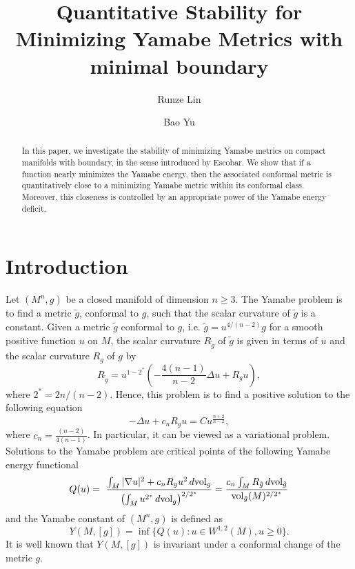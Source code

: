 \documentclass[12pt]{amsart}
\title[Quantitative Stability]{Quantitative Stability for Minimizing Yamabe Metrics with minimal boundary}
\newcommand{\na}{{\nabla}}
\newcommand{\vol}{{\rm{vol}}}
\begin{document}
\author{Runze Lin}
\address{Institut de Mathématiques de Toulouse, Université Paul Sabatier, 118, route de Narbonne, 31062 Toulouse
Cedex, France}
\author{Bao Yu }
\address{School of Mathematical Sciences, University of Science and Technology of China, Hefei, Anhui Province, P. R. China, 230006}


\begin{abstract}
	In this paper, we investigate the stability of minimizing Yamabe metrics on compact manifolds with boundary, in the sense introduced by Escobar. We show that if a function nearly minimizes the Yamabe energy, then the associated conformal metric is quantitatively close to a minimizing Yamabe metric within its conformal class. Moreover, this closeness is controlled by an appropriate power of the Yamabe energy deficit.
	\vskip0.3cm
	\\
\end{abstract}
\maketitle
\section{Introduction}
    Let $(M^n,g)$ be a closed manifold  of dimension $n\ge 3$. The Yamabe problem is to find a metric  $\tilde{g}$, conformal to $g$, such that the scalar curvature of $\tilde{g}$ is a constant. Given a metric $\tilde{g}$ conformal to $g$, i.e.  $\tilde{g} = u^{4/(n-2)} g$ for  a smooth positive function $u$ on $M$, the scalar curvature $R_{\tilde{g}}$ of $\tilde{g}$ is given in terms of $u$ and the scalar curvature $R_g$ of $g$  by
\begin{equation}\label{eqn: comformal change}
R_{\tilde{g}} = u^{1-2^*}\left(-\frac{4(n-1)}{n-2} \Delta u + R_g u \right),
\end{equation}
where $2^* = 2n/(n-2)$. Hence, this problem is to find  a positive solution to the following equation
\begin{equation}\label{eqn: yamabe equation}
    -\Delta u + c_nR_g u = C u^\frac{n+2}{n-2},
\end{equation}
where $c_n =\frac{(n-2)}{4(n-1)}$. In particular, it can be viewed as a variational problem. Solutions to the Yamabe problem are critical points of the following Yamabe energy functional
\begin{equation}\label{eqn: Yamabe functional}
Q(u) =
\ \frac{ \int_M  |\na u|^2 + c_n R_g u^2 \, d\vol_g}
  {\left(\int_M u^{2^*}\, d\vol_g\right)^{2/2^*}} =\frac{c_n\int_M R_{\tilde{g}}\, d\vol_{\tilde{g}} } 
{ \vol_{\tilde{g}}(M )^{2/2^*}}
 \end{equation}
and the Yamabe constant of $(M^n,g)$ is defined as
\begin{equation}
    Y(M,[g])=\inf\{Q(u):u\in W^{1,2}(M), u\ge0\}.
\end{equation}
It is well known that $Y(M,[g])$ is invariant under a conformal change of the metric $g$.
\\
\end{document}
